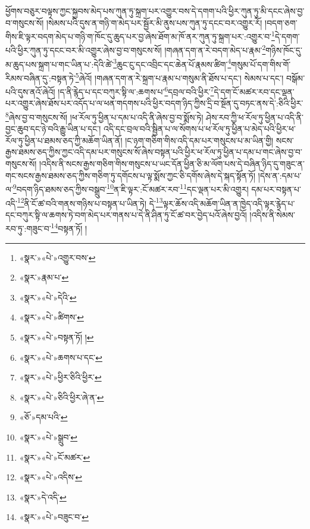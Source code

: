 ཕྱོགས་བཅུར་བལྟས་ཀྱང་སྐྱབས་མེད་པས་ཀུན་ཏུ་སྐྲག་པར་འགྱུར་བས་དེ་དགག་པའི་ཕྱིར་ཀུན་ཏུ་མི་དངང་ཞེས་བྱ་བ་གསུངས་སོ། །སེམས་པའི་དུས་ན་གཉི་ག་མེད་པར་སྦྱོར་མི་ནུས་པས་ཀུན་ཏུ་དངང་བར་འགྱུར་རོ། །བདག་ཅག་གིས་ཇི་ལྟར་བདག་མེད་པ་གཉི་ག་ཁོང་དུ་ཆུད་པར་བྱ་ཞེས་ཐོག་མ་ཁོ་ནར་ཀུན་ཏུ་སྐྲག་པར་:འགྱུར་བ་\footnote{«སྣར་»«པེ་»འགྱུར་བས་}དེ་དགག་པའི་ཕྱིར་ཀུན་ཏུ་དངང་བར་མི་འགྱུར་ཞེས་བྱ་བ་གསུངས་སོ། །གཞན་དག་ན་རེ་བདག་མེད་པ་རྣམ་\footnote{«སྣར་»རྣམ་པ་}གཉིས་ཁོང་དུ་མ་ཆུད་པས་སྐྲག་པ་གང་ཡིན་པ་:དེའི་ཚེ་\footnote{«སྣར་»«པེ་»དེའི་}ཆུང་ངུ་དང་འབྲིང་དང་ཆེན་པོ་རྣམས་ཚིག་\footnote{«སྣར་»«པེ་»ཚིགས་}གསུམ་པོ་དག་གིས་གོ་རིམས་བཞིན་དུ་:བསྟན་ཏེ་\footnote{«སྣར་»«པེ་»བསྟན་ཏོ། །}ཞེའོ། །གཞན་དག་ན་རེ་སྐྲག་པ་རྣམ་པ་གསུམ་ནི་ཐོས་པ་དང་། སེམས་པ་དང་། བསྒོམ་པའི་དུས་ནའོ་ཞེའོ། །ད་ནི་རྙེད་པ་དང་བཀུར་སྟི་ལ་:ཆགས་པ་\footnote{«སྣར་»«པེ་»ཆགས་པ་དང་}དབྲལ་བའི་ཕྱིར་\footnote{«སྣར་»«པེ་»ཕྱིར་ཅིའི་ཕྱིར་}དེ་དག་ངོ་མཚར་རབ་དང་ལྡན་པར་འགྱུར་ཞེས་ཐོས་པར་འདོད་པ་ལ་ཕན་གདགས་པའི་ཕྱིར་བདག་ཉིད་ཀྱིས་དྲི་བ་སྔོན་དུ་བཏང་ནས་དེ་:ཅིའི་ཕྱིར་\footnote{«སྣར་»«པེ་»ཅིའི་ཕྱིར་ཞེ་ན་}ཞེས་བྱ་བ་གསུངས་སོ། །ཕ་རོལ་ཏུ་ཕྱིན་པ་དམ་པ་འདི་ནི་ཞེས་བྱ་བ་སྨོས་ཏེ། ཤེས་རབ་ཀྱི་ཕ་རོལ་ཏུ་ཕྱིན་པ་འདི་ནི་བྱང་ཆུབ་དང་ཉེ་བའི་རྒྱུ་ཡིན་པ་དང་། འདི་དང་བྲལ་བའི་སྦྱིན་པ་ལ་སོགས་པ་ཕ་རོལ་ཏུ་ཕྱིན་པ་མེད་པའི་ཕྱིར་ཕ་རོལ་ཏུ་ཕྱིན་པ་ཐམས་ཅད་ཀྱི་མཆོག་ཡིན་ནོ། །ང་ཉག་གཅིག་གིས་འདི་དམ་པར་གསུངས་པ་མ་ཡིན་གྱི། སངས་རྒྱས་ཐམས་ཅད་ཀྱིས་ཀྱང་འདི་དམ་པར་གསུངས་སོ་ཞེས་བསྟན་པའི་ཕྱིར་ཕ་རོལ་ཏུ་ཕྱིན་པ་དམ་པ་གང་ཞེས་བྱ་བ་གསུངས་སོ། །འདིས་ནི་སངས་རྒྱས་གཅིག་གིས་གསུངས་པ་ཡང་དོན་ཕྱིན་ཅི་མ་ལོག་པས་དེ་བཞིན་ཉིད་དུ་གཟུང་ན་གང་སངས་རྒྱས་ཐམས་ཅད་ཀྱིས་གཅིག་ཏུ་དགོངས་པ་ལྟ་སྨོས་ཀྱང་ཅི་དགོས་ཞེས་དེ་སྐད་སྟོན་ཏོ། །དེས་ན་:དམ་པ་ལ་\footnote{«ཅོ་»དམ་པའི་}བདག་ཉིད་ཐམས་ཅད་ཀྱིས་བསྒྲུབ་\footnote{«སྣར་»«པེ་»སྒྲུབ་}ན་ཇི་ལྟར་:ངོ་མཚར་རབ་\footnote{«སྣར་»«པེ་»ངོ་མཚར་}དང་ལྡན་པར་མི་འགྱུར། དམ་པར་བསྟན་པ་འདི་\footnote{«སྣར་»«པེ་»འདིས་}ནི་ངོ་ཚ་བའི་གནས་གཉིས་པ་བསྟན་པ་ཡིན་ཏེ། དེ་\footnote{«སྣར་»དེ་འདི་}ལྟར་ཆོས་འདི་མཆོག་ཡིན་ན་ཁྱེད་འདི་ལྟར་རྙེད་པ་དང་བཀུར་སྟི་ལ་ཆགས་ཏེ་བག་མེད་པར་གནས་པ་དེ་ནི་ཤིན་ཏུ་ངོ་ཚ་བར་བྱེད་པའོ་ཞེས་བྱའོ། །འདིས་ནི་སེམས་རབ་ཏུ་:གཟུང་བ་\footnote{«སྣར་»«པེ་»བཟུང་བ་}བསྟན་ཏོ། །
